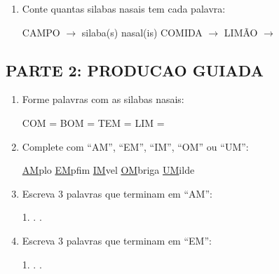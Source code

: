 \begin{exercicio}
\begin{enumerate}
  \item Conte quantas silabas nasais tem cada palavra:
  \begin{center}
  CAMPO $\rightarrow$ \underline{\hspace{1cm}} silaba(s) nasal(is) \quad COMIDA $\rightarrow$ \underline{\hspace{1cm}} \quad LIM\~AO $\rightarrow$ \underline{\hspace{1cm}}
  \end{center}
\end{enumerate}

\subsection*{PARTE 2: PRODUCAO GUIADA}

\begin{enumerate}[resume]
  \item Forme palavras com as silabas nasais:
  \begin{center}
  COM = \underline{\hspace{2cm}} \quad BOM = \underline{\hspace{2cm}} \quad TEM = \underline{\hspace{2cm}} \quad LIM = \underline{\hspace{2cm}}
  \end{center}

  \item Complete com ``AM'', ``EM'', ``IM'', ``OM'' ou ``UM'':
  \begin{center}
  \underline{AM}plo \quad \underline{EM}pfim \quad \underline{IM}vel \quad \underline{OM}briga \quad \underline{UM}ilde
  \end{center}

  \item Escreva 3 palavras que terminam em ``AM'':
  \begin{center}
  1. \underline{\hspace{3cm}} . \underline{\hspace{3cm}} . \underline{\hspace{3cm}}
  \end{center}

  \item Escreva 3 palavras que terminam em ``EM'':
  \begin{center}
  1. \underline{\hspace{3cm}} . \underline{\hspace{3cm}} . \underline{\hspace{3cm}}
  \end{center}


\end{enumerate}
\end{exercicio}
